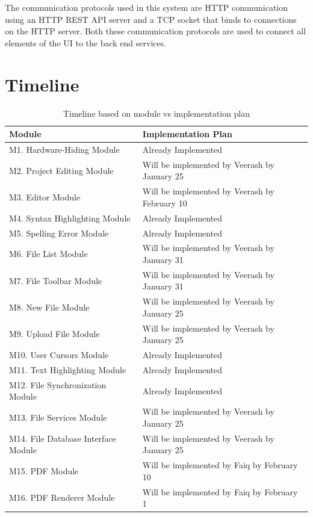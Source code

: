 \documentclass[12pt, titlepage]{article}
\begin{document}
	The communication protocols used in this system are HTTP communication using an HTTP REST API server and a TCP socket that binds to connections on the HTTP server. Both these communication protocols are used to connect all elements of the UI to the back end services.
	
	\section{Timeline}
	
	
	\footnotesize\begin{longtable}{p{} p{}}
		\caption{Timeline based on module vs implementation plan}\\
		\toprule
		\textbf{Module} & \textbf{Implementation Plan}\\
		\midrule
		M1. Hardware-Hiding Module &  Already Implemented  \\
		M2. Project Editing Module &  Will be implemented by Veerash by January 25  \\
		M3. Editor Module &  Will be implemented by Veerash by February 10  \\
		M4. Syntax Highlighting Module &  Already Implemented  \\
		M5. Spelling Error Module &  Already Implemented  \\
		M6. File List Module &  Will be implemented by Veerash by January 31  \\
		M7. File Toolbar Module &  Will be implemented by Veerash by January 31  \\
		M8. New File Module &  Will be implemented by Veerash by January 25  \\
		M9. Upload File Module &  Will be implemented by Veerash by January 25  \\
		M10. User Cursors Module &  Already Implemented  \\
		M11. Text Highlighting Module &  Already Implemented  \\
		M12. File Synchronization Module &  Already Implemented  \\
		M13. File Services Module &  Will be implemented by Veerash by January 25  \\
		M14. File Database Interface Module &  Will be implemented by Veerash by January 25  \\
		M15. PDF Module &  Will be implemented by Faiq by February 10  \\
		M16. PDF Renderer Module &  Will be implemented by Faiq by February 1  \\

\end{longtable}
\end{document}
